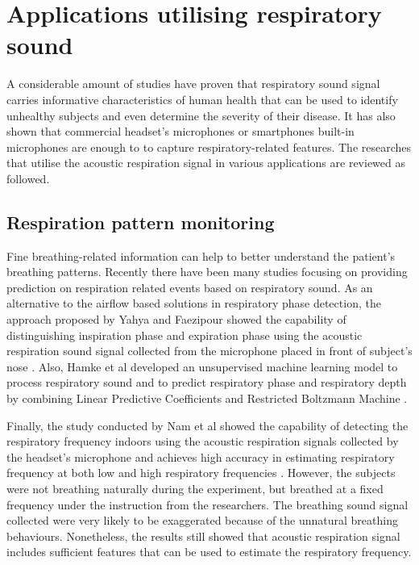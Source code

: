 \section{Applications utilising respiratory sound}
A considerable amount of studies have proven that respiratory sound signal carries informative characteristics of human health that can be used to identify unhealthy subjects and even determine the severity of their disease. It has also shown that commercial headset's microphones or smartphones built-in microphones are enough to to capture respiratory-related features. The researches that utilise the acoustic respiration signal in various applications are reviewed as followed.

\subsection{Respiration pattern monitoring}
Fine breathing-related information can help to better understand the patient's breathing patterns. Recently there have been many studies focusing on providing prediction on respiration related events based on respiratory sound. As an alternative to the airflow based solutions in respiratory phase detection, the approach proposed by Yahya and Faezipour showed the capability of distinguishing inspiration phase and expiration phase using the acoustic respiration sound signal collected from the microphone placed in front of subject’s nose \cite{Yahya2014AutomaticCycles}. Also, Hamke et al developed an unsupervised machine learning model to process respiratory sound and to predict respiratory phase and respiratory depth by combining Linear Predictive Coefficients and Restricted Boltzmann Machine \cite{Hamke2019DetectingMachines}.

Finally, the study conducted by Nam et al showed the capability of detecting the respiratory frequency indoors using the acoustic respiration signals collected by the headset’s microphone and achieves high accuracy in estimating respiratory frequency at both low and high respiratory frequencies \cite{Nam2016EstimationHeadset}. However, the subjects were not breathing naturally during the experiment, but breathed at a fixed frequency under the instruction from the researchers. The breathing sound signal collected were very likely to be exaggerated because of the unnatural breathing behaviours. Nonetheless, the results still showed that acoustic respiration signal includes sufficient features that can be used to estimate the respiratory frequency. 

